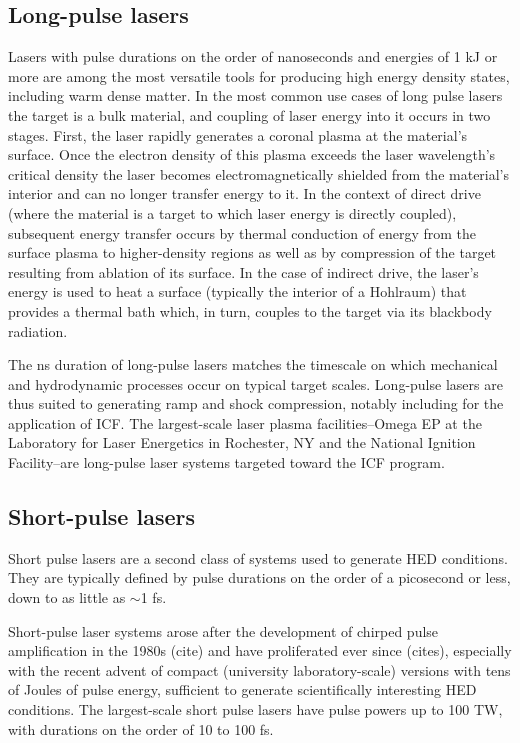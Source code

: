 \documentclass [11pt, proquest, article] {uwthesis}[2016/11/22]
\begin{document}
\subsection{Long-pulse lasers}
Lasers with pulse durations on the order of nanoseconds and energies of 1 kJ or more are among the most versatile tools for producing high energy density states, including warm dense matter. In the most common use cases of long pulse lasers the target is a bulk material, and coupling of laser energy into it occurs in two stages. First, the laser rapidly  generates a coronal plasma at the material's surface. Once the electron density of this plasma exceeds the laser wavelength's critical density  the laser becomes electromagnetically shielded from the material's interior and can no longer transfer energy to it. In the context of direct drive (where the material is a target to which laser energy is directly coupled), subsequent energy transfer occurs by thermal conduction of energy from the surface plasma to higher-density regions as well as by compression of the target resulting from ablation of its surface. In the case of indirect drive, the laser's energy is used to heat a surface (typically the interior of a Hohlraum) that provides a thermal bath which, in turn, couples to the target via its blackbody radiation. 

The ns duration of long-pulse lasers matches the timescale on which mechanical and hydrodynamic processes occur on typical target scales. Long-pulse lasers are thus suited to generating ramp and shock compression, notably including for the application of ICF. The largest-scale laser plasma facilities--Omega EP at the Laboratory for Laser Energetics in Rochester, NY and the National Ignition Facility--are long-pulse laser systems targeted toward the ICF program.


\subsection{Short-pulse lasers}
Short pulse lasers are a second class of systems used to generate HED conditions. They are typically defined by pulse durations on the order of a picosecond or less, down to as little as $\sim$1 fs. 

Short-pulse laser systems arose after the development of chirped pulse amplification in the 1980s (cite) and have proliferated ever since (cites), especially with the recent advent of compact (university laboratory-scale) versions with tens of Joules of pulse energy, sufficient to generate scientifically interesting HED conditions. The largest-scale short pulse lasers have pulse powers up to 100 TW, with durations on the order of 10 to 100 fs.
\end{document}
